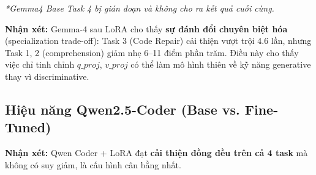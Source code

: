 \begin{table}[h]
\centering
\renewcommand{\arraystretch}{1.3}
\caption{Kết quả Gemma-4-E4B-IT trên DebugEval Benchmark}
\label{tab:gemma_results}
\end{table}

\textit{*Gemma4 Base Task 4 bị gián đoạn và không cho ra kết quả cuối cùng.}

\textbf{Nhận xét:} Gemma-4 sau LoRA cho thấy \textbf{sự đánh đổi chuyên biệt hóa} (specialization trade-off): Task 3 (Code Repair) cải thiện vượt trội 4.6 lần, nhưng Task 1, 2 (comprehension) giảm nhẹ 6--11 điểm phần trăm. Điều này cho thấy việc chỉ tinh chỉnh $q\_proj$, $v\_proj$ có thể làm mô hình thiên về kỹ năng generative thay vì discriminative.

\subsection{Hiệu năng Qwen2.5-Coder (Base vs. Fine-Tuned)}

\begin{table}[h]
\centering
\renewcommand{\arraystretch}{1.3}
\caption{Kết quả Qwen2.5-Coder-3B-Instruct trên DebugEval Benchmark}
\label{tab:qwen_results}
\end{table}

\textbf{Nhận xét:} Qwen Coder + LoRA đạt \textbf{cải thiện đồng đều trên cả 4 task} mà không có suy giảm, là cấu hình cân bằng nhất.

